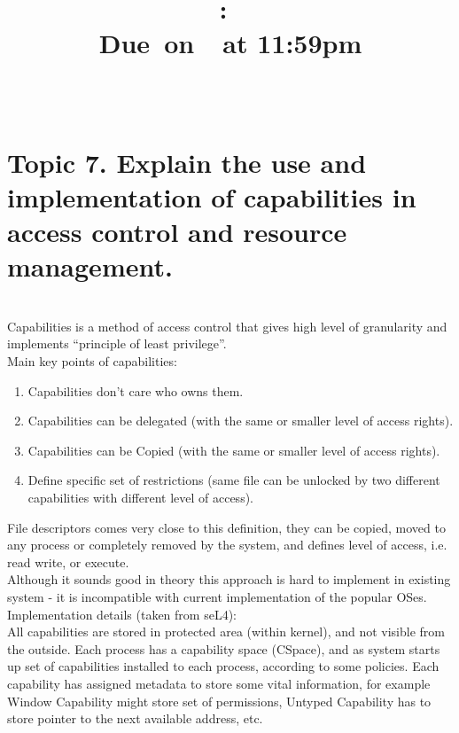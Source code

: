 \documentclass{article}
\title{
    \vspace{2in}
    \textmd{\textbf{\hmwkClass:\ \hmwkTitle}}\\
        \normalsize\vspace{0.1in}\small{Due\ on\ \hmwkDueDate\ at 11:59pm}\\
        \vspace{0.1in}\large{\textit{\hmwkClassInstructor\ \hmwkClassTime}}
    \vspace{3in}
}
\author{\textbf{\hmwkAuthorName}}
\date{}
\begin{document}
\maketitle

\pagebreak

        \section{Topic 7. Explain the use and implementation of capabilities in access control and resource
        management.}\\

        Capabilities is a method of access control that gives high level of granularity and
        implements ``principle of least privilege''.\\
        Main key points of capabilities:
        \begin{enumerate}[$\bullet$]
            \item Capabilities don't care who owns them.
            \item Capabilities can be delegated (with the same or smaller level of access rights).
            \item Capabilities can be Copied (with the same or smaller level of access rights).
            \item Define specific set of restrictions (same file can be unlocked by two different
                capabilities with different level of access).
        \end{enumerate}

        File descriptors comes very close to this definition, they can be copied, moved to any
        process or completely removed by the system, and defines level of access, i.e. read
        write, or execute.\\
        Although it sounds good in theory this approach is hard to implement in existing
        system - it is incompatible with current implementation of the popular OSes.\\


        Implementation details (taken from seL4):\\
        All capabilities are stored in protected area (within kernel), and not visible from the outside. Each
        process has a capability space (CSpace), and  as system starts up set of capabilities installed to each process,
        according to some policies. Each capability has assigned metadata to store some vital information,
        for example Window Capability might store set of permissions, Untyped Capability has to store pointer
        to the next available address, etc.
\end{document}
